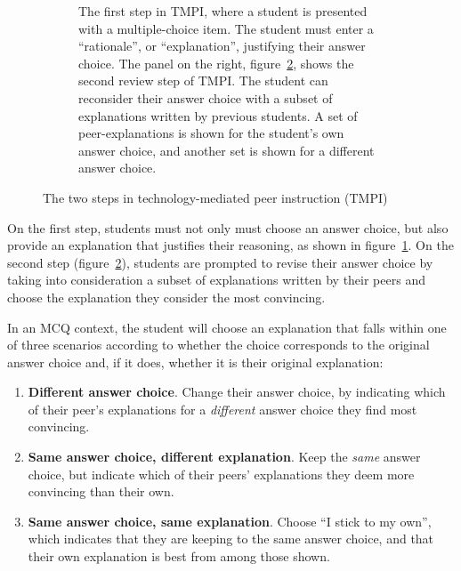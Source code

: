 \documentclass[notitlepage,12pt]{jedm}
\begin{document}
\begin{figure}
	\begin{subfigure}[b]{0.4\textwidth}
		\def\svgscale{0.50}
		
		\caption{
			The first step in TMPI, where a student is presented with a 
			multiple-choice item. The student must enter a ``rationale'', or 
			``explanation'', justifying their answer choice.
			\newline
			\newline
			The panel on the right, figure~\protect\ref{fig:question_review}, 
			shows the second review step of TMPI.
			The student can reconsider their answer choice with a subset of explanations written by previous students.
			A set of peer-explanations is shown for the student's own answer 
			choice, and another set is shown for a different answer choice. 
		}
		\label{fig:question_start}
	\end{subfigure}
	\qquad
	\begin{subfigure}[b]{0.6\textwidth}
		\def\svgscale{0.50}
		
		\caption{}
		\label{fig:question_review}
	\end{subfigure}
	\caption{The two steps in technology-mediated peer 
		instruction (TMPI)}
	\label{fig:tmpi}
\end{figure}

On the first step, students must not only must choose an answer choice, but 
also provide an explanation that justifies their reasoning, as shown in figure~\ref{fig:question_start}.
On the second step (figure~\ref{fig:question_review}), students are prompted to 
revise their answer choice by taking into consideration a subset of 
explanations written by their peers and choose the explanation they consider the most convincing.

In an MCQ context, the student will choose an explanation that falls within one of three scenarios according to whether the choice corresponds to the original answer choice and, if it does, whether it is their original explanation:
\begin{enumerate}
	\item \textbf{Different answer choice}. Change their answer choice, by indicating which of their peer's 
	explanations for a \textit{different} answer choice they find most convincing.
	\item \textbf{Same answer choice, different explanation}. Keep the \textit{same} answer choice, but indicate which of their 
	peers' explanations they deem more convincing than their own.
	\item \textbf{Same answer choice, same explanation}. Choose ``I stick to my own'', which indicates that they are keeping 
	to the same answer choice, and that their own explanation is best from 
	among those shown.
\end{enumerate}
\end{document}
